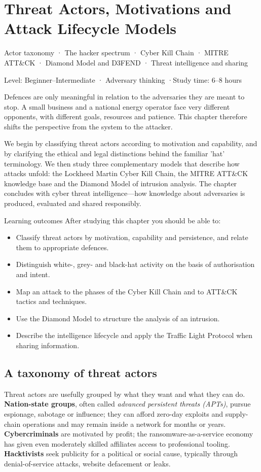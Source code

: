 \documentclass[11pt,openany]{book}
\newcommand{\chaptermeta}[3]{%
  {\sffamily\small\color{accent}#1\par}\vspace{0.3em}
  {\sffamily\footnotesize\color{gray}#2 \quad·\quad #3\par}\vspace{1.2em}}
\begin{document}
\chapter{Threat Actors, Motivations and Attack Lifecycle Models}\label{ch:3}
\chaptermeta{Actor taxonomy · The hacker spectrum · Cyber Kill Chain · MITRE ATT\&CK · Diamond Model and D3FEND · Threat intelligence and sharing}{Level: Beginner–Intermediate · Adversary thinking}{Study time: 6–8 hours}

Defences are only meaningful in relation to the adversaries they are meant to stop. A small business and a national energy operator face very different opponents, with different goals, resources and patience. This chapter therefore shifts the perspective from the system to the attacker.

We begin by classifying threat actors according to motivation and capability, and by clarifying the ethical and legal distinctions behind the familiar 'hat' terminology. We then study three complementary models that describe how attacks unfold: the Lockheed Martin Cyber Kill Chain, the MITRE ATT\&CK knowledge base and the Diamond Model of intrusion analysis. The chapter concludes with cyber threat intelligence—how knowledge about adversaries is produced, evaluated and shared responsibly.

\begin{outcomesbox}{Learning outcomes}
After studying this chapter you should be able to:
\begin{itemize}
  \item Classify threat actors by motivation, capability and persistence, and relate them to appropriate defences.
  \item Distinguish white-, grey- and black-hat activity on the basis of authorisation and intent.
  \item Map an attack to the phases of the Cyber Kill Chain and to ATT\&CK tactics and techniques.
  \item Use the Diamond Model to structure the analysis of an intrusion.
  \item Describe the intelligence lifecycle and apply the Traffic Light Protocol when sharing information.
\end{itemize}
\end{outcomesbox}

\section{A taxonomy of threat actors}\label{sec:3.1}
Threat actors are usefully grouped by what they want and what they can do. \textbf{Nation-state groups}, often called \emph{advanced persistent threats (APTs)}, pursue espionage, sabotage or influence; they can afford zero-day exploits and supply-chain operations and may remain inside a network for months or years. \textbf{Cybercriminals} are motivated by profit; the ransomware-as-a-service economy has given even moderately skilled affiliates access to professional tooling. \textbf{Hacktivists} seek publicity for a political or social cause, typically through denial-of-service attacks, website defacement or leaks.
\end{document}
